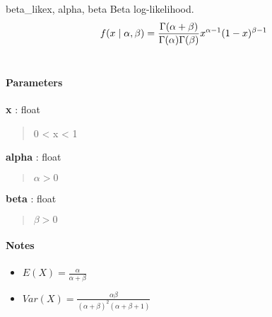 \hypertarget{pymc.distributions.beta_like}{}
\begin{funcdesc}{beta\_like}{x, alpha, beta}
Beta log-likelihood.
\begin{gather}
\begin{split}f(x \mid \alpha, \beta) = \frac{\Gamma(\alpha + \beta)}{\Gamma(\alpha) \Gamma(\beta)} x^{\alpha - 1} (1 - x)^{\beta - 1}\end{split}\notag\\\begin{split}\end{split}\notag
\end{gather}
\paragraph{Parameters}
\begin{paramlist}
\item[] \textbf{x} : float
\begin{quote}

0 \textless{} x \textless{} 1
\end{quote}

\item[] \textbf{alpha} : float
\begin{quote}
$\alpha>0$
\end{quote}

\item[] \textbf{beta} : float
\begin{quote}
$\beta>0$
\end{quote}
\end{paramlist}
\paragraph{Notes}
\begin{itemize}
\item {} 
$E(X)=\frac{\alpha}{\alpha+\beta}$

\item {} 
$Var(X)=\frac{\alpha \beta}{(\alpha+\beta)^2(\alpha+\beta+1)}$

\end{itemize}

\end{funcdesc}

